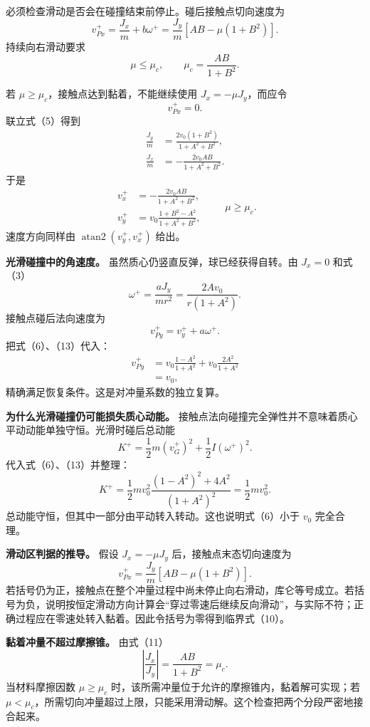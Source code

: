 \documentclass[12pt,a4paper,UTF8]{ctexart}
\begin{document}
必须检查滑动是否会在碰撞结束前停止。碰后接触点切向速度为 \[
v_{Px}^+
=\frac{J_x}{m}+b\omega^+
=\frac{J_y}{m}
\left[AB-\mu(1+B^2)\right].
\] 持续向右滑动要求 \[
\mu\le\mu_c,\qquad
\boxed{\mu_c=\frac{AB}{1+B^2}}. \tag{10}
\]

若 \(\mu\ge\mu_c\)，接触点达到黏着，不能继续使用
\(J_x=-\mu J_y\)，而应令 \[
v_{Px}^+=0.
\] 联立式（5）得到 \[
\begin{aligned}
\frac{J_y}{m}
&=\frac{2v_0(1+B^2)}{1+A^2+B^2},\\
\frac{J_x}{m}
&=-\frac{2v_0AB}{1+A^2+B^2}.
\end{aligned} \tag{11}
\] 于是 \[
\boxed{
\begin{aligned}
v_x^+&=-\frac{2v_0AB}{1+A^2+B^2},\\
v_y^+&=v_0\frac{1+B^2-A^2}{1+A^2+B^2},
\end{aligned}
}\qquad \mu\ge\mu_c. \tag{12}
\] 速度方向同样由 \(\operatorname{atan2}(v_y^+,v_x^+)\) 给出。

\textbf{光滑碰撞中的角速度。} 虽然质心仍竖直反弹，球已经获得自转。由
\(J_x=0\) 和式（3） \[
\omega^+
=\frac{aJ_y}{mr^2}
=\frac{2Av_0}{r(1+A^2)}. \tag{13}
\] 接触点碰后法向速度为 \[
v_{Py}^+
=v_y^++a\omega^+.
\] 把式（6）、（13）代入： \[
\begin{aligned}
v_{Py}^+
&=v_0\frac{1-A^2}{1+A^2}
+v_0\frac{2A^2}{1+A^2}\\
&=v_0,
\end{aligned}
\] 精确满足恢复条件。这是对冲量系数的独立复算。

\textbf{为什么光滑碰撞仍可能损失质心动能。}
接触点法向碰撞完全弹性并不意味着质心平动动能单独守恒。光滑时碰后总动能
\[
K^+=\frac12m(v_G^+)^2+\frac12I(\omega^+)^2.
\] 代入式（6）、（13）并整理： \[
K^+
=\frac12mv_0^2
\frac{(1-A^2)^2+4A^2}{(1+A^2)^2}
=\frac12mv_0^2.
\] 总动能守恒，但其中一部分由平动转入转动。这也说明式（6）小于 \(v_0\)
完全合理。

\textbf{滑动区判据的推导。} 假设 \(J_x=-\mu J_y\)
后，接触点末态切向速度为 \[
v_{Px}^+
=\frac{J_y}{m}[AB-\mu(1+B^2)].
\]
若括号仍为正，接触点在整个冲量过程中尚未停止向右滑动，库仑等号成立。若括号为负，说明按恒定滑动方向计算会``穿过零速后继续反向滑动''，与实际不符；正确过程应在零速处转入黏着。因此令括号为零得到临界式（10）。

\textbf{黏着冲量不超过摩擦锥。} 由式（11） \[
\left|\frac{J_x}{J_y}\right|
=\frac{AB}{1+B^2}
=\mu_c.
\] 当材料摩擦因数 \(\mu\ge\mu_c\)
时，该所需冲量位于允许的摩擦锥内，黏着解可实现；若
\(\mu<\mu_c\)，所需切向冲量超过上限，只能采用滑动解。这个检查把两个分段严密地接合起来。
\end{document}
